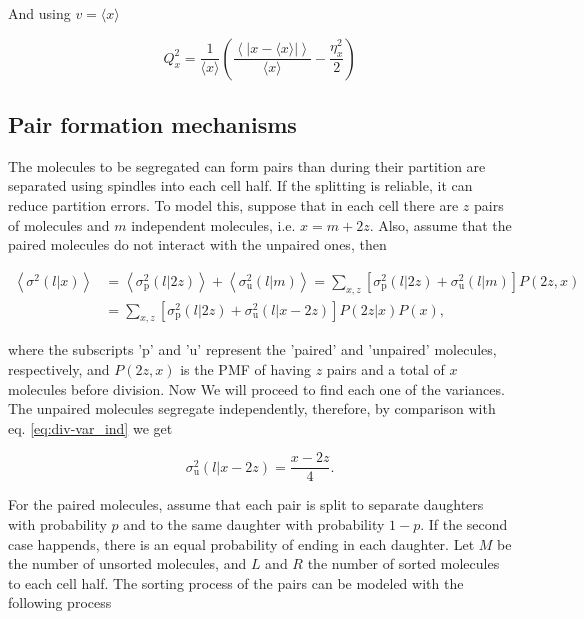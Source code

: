 And using $v=\langle x\rangle$

\begin{equation*}
  Q_x^2 = \frac{1}{\langle x\rangle}\left(\frac{\left\langle\left|x-\langle x\rangle\right|\right\rangle}{\langle x\rangle}-\frac{\eta_x^2}{2}\right)
\end{equation*}


\subsection{Pair formation mechanisms}

The molecules to be segregated can form pairs than during their partition are separated using spindles into each cell half. If the splitting is reliable, it can reduce partition errors. To model this, suppose that in each cell there are $z$ pairs of molecules and $m$ independent molecules, i.e. $x=m+2z$. Also, assume that the paired molecules do not interact with the unpaired ones, then

\begin{equation}
  \label{eq:div-pu}
  \begin{split}
    \left\langle\sigma^2(l|x)\right\rangle &= \left\langle\sigma^2_\text{p}(l|2z)\right\rangle + \left\langle\sigma^2_\text{u}(l|m)\right\rangle = \sum_{x,z}\left[\sigma^2_\text{p}(l|2z) + \sigma^2_\text{u}(l|m)\right]P(2z,x)\\
    &= \sum_{x,z}\left[\sigma^2_\text{p}(l|2z) + \sigma^2_\text{u}(l|x-2z)\right]P(2z|x)P(x),
  \end{split}
\end{equation}

where the subscripts 'p' and 'u' represent the 'paired' and 'unpaired' molecules, respectively, and $P(2z,x)$ is the PMF of having $z$ pairs and a total of $x$ molecules before division. Now We will proceed to find each one of the variances. The unpaired molecules segregate independently, therefore, by comparison with eq. \eqref{eq:div-var_ind} we get

\begin{equation}
  \label{eq:div-u}
  \sigma^2_\text{u}(l|x-2z) = \frac{x-2z}{4}.
\end{equation}

For the paired molecules, assume that each pair is split to separate daughters with probability $p$ and to the same daughter with probability $1-p$. If the second case happends, there is an equal probability of ending in each daughter. Let $M$ be the number of unsorted molecules, and $L$ and $R$ the number of sorted molecules to each cell half. The sorting process of the pairs can be modeled with the following process

